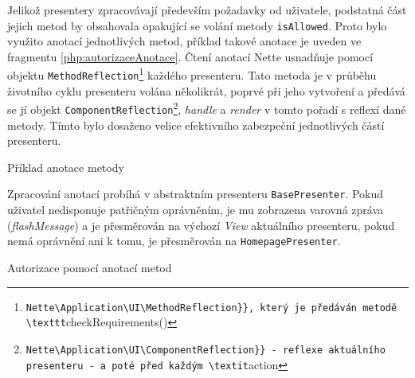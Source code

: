 Jelikož presentery zpracovávají především požadavky od uživatele, podstatná část jejich metod by obsahovala opakující se volání metody \texttt{isAllowed}. Proto bylo využito anotací jednotlivých metod, příklad takové anotace je uveden ve fragmentu \ref{php:autorizaceAnotace}. Čtení anotací Nette usnadňuje pomocí objektu \texttt{MethodReflection}\footnote{\Verb{Nette\Application\UI\MethodReflection}}, který je předáván metodě \texttt{checkRequirements()} každého presenteru. Tato metoda je v průběhu životního cyklu presenteru volána několikrát, poprvé při jeho vytvoření a předává se jí objekt \texttt{ComponentReflection}\footnote{\Verb{Nette\Application\UI\ComponentReflection}} - reflexe aktuálního presenteru - a poté před každým \textit{action}, \textit{handle} a \textit{render} v tomto pořadí s reflexí dané metody. Tímto bylo dosaženo velice efektivního zabezpeční jednotlivých částí presenteru.

\begin{listing}[ht]
\caption{Příklad anotace metody}
\label{php:autorizaceAnotace}
\end{listing}

\clearpage
Zpracování anotací probíhá v abstraktním presenteru \texttt{BasePresenter}. Pokud uživatel nedisponuje patřičným oprávněním, je mu zobrazena varovná zpráva (\textit{flashMessage}) a je přesměrován na výchozí \textit{View} aktuálního presenteru, pokud nemá oprávnění ani k tomu, je přesměrován na \texttt{HomepagePresenter}.

\begin{listing}[ht]
\caption{Autorizace pomocí anotací metod}
\label{php:autorizaceCheckRequirements}
\end{listing}